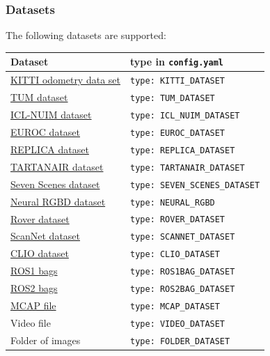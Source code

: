 \documentclass{article}
\begin{document}
\hypertarget{datasets}{%
\subsubsection{Datasets}\label{datasets}}

The following datasets are supported:

\begin{longtable}[]{@{}ll@{}}
\toprule
Dataset & type in \texttt{config.yaml}\tabularnewline
\midrule
\endhead
\href{http://www.cvlibs.net/datasets/kitti/eval_odometry.php}{KITTI
odometry data set} \cite{Geiger2012CVPR} &
\texttt{type:\ KITTI\_DATASET} \tabularnewline
\href{https://vision.in.tum.de/data/datasets/rgbd-dataset/download}{TUM
dataset} \cite{sturm12iros} & \texttt{type:\ TUM\_DATASET} \tabularnewline
\href{https://www.doc.ic.ac.uk/~ahanda/VaFRIC/iclnuim.html}{ICL-NUIM
dataset} \cite{handa:etal:ICRA2014} & \texttt{type:\ ICL\_NUIM\_DATASET}\tabularnewline
\href{https://projects.asl.ethz.ch/datasets/euroc-mav/}{EUROC
dataset} \cite{Burri25012016} & \texttt{type:\ EUROC\_DATASET}\tabularnewline
\href{https://github.com/facebookresearch/Replica-Dataset}{REPLICA
dataset} \cite{replica19arxiv} & \texttt{type:\ REPLICA\_DATASET}\tabularnewline
\href{https://theairlab.org/tartanair-dataset/}{TARTANAIR dataset} \cite{tartanair2020iros} &
\texttt{type:\ TARTANAIR\_DATASET}\tabularnewline
\href{https://www.microsoft.com/en-us/research/project/rgb-d-dataset-7-scenes/}{Seven Scenes dataset} \cite{seven_scenes} &
\texttt{type:\ SEVEN\_SCENES\_DATASET}\tabularnewline
\href{https://github.com/dazinovic/neural-rgbd-surface-reconstruction}{Neural RGBD dataset} \cite{Azinovic_2022_CVPR} &
\texttt{type:\ NEURAL\_RGBD}\tabularnewline
\href{https://iis-esslingen.github.io/rover/}{Rover dataset} \cite{schmidt2025rover} &
\texttt{type:\ ROVER\_DATASET}\tabularnewline
\href{http://www.scan-net.org/}{ScanNet dataset} \cite{dai2017scannet} &
\texttt{type:\ SCANNET\_DATASET}\tabularnewline
\href{https://github.com/MIT-SPARK/Clio}{CLIO dataset} \cite{kim2024clio} &
\texttt{type:\ CLIO\_DATASET}\tabularnewline
\href{https://wiki.ros.org/Bags}{ROS1 bags} &
\texttt{type:\ ROS1BAG\_DATASET}\tabularnewline
\href{https://docs.ros.org/en/foxy/Tutorials/Beginner-CLI-Tools/Recording-And-Playing-Back-Data/Recording-And-Playing-Back-Data.html}{ROS2
bags} & \texttt{type:\ ROS2BAG\_DATASET}\tabularnewline
\href{https://foxglove.dev/blog/introducing-the-mcap-file-format}{MCAP
file} & \texttt{type:\ MCAP\_DATASET}\tabularnewline
Video file & \texttt{type:\ VIDEO\_DATASET}\tabularnewline
Folder of images & \texttt{type:\ FOLDER\_DATASET}\tabularnewline
\bottomrule
\end{longtable}
\end{document}
